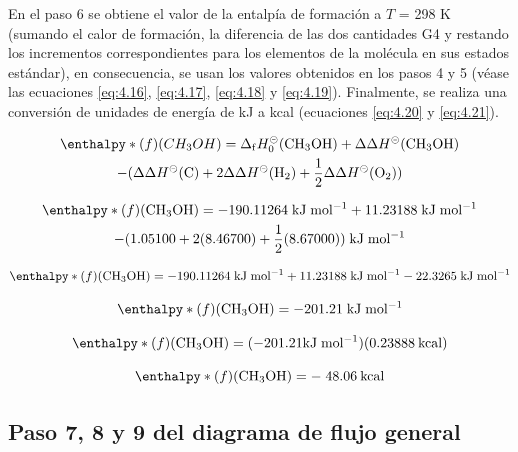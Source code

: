 En el paso 6 se obtiene el valor de la entalpía de formación a $T$ = 298 K (sumando el calor de formación, la diferencia de las dos cantidades G4 y restando los incrementos correspondientes para los elementos de la molécula en sus estados estándar), en consecuencia, se usan los valores obtenidos en los pasos 4 y 5 (véase las ecuaciones \ref{eq:4.16}, \ref{eq:4.17}, \ref{eq:4.18} y \ref{eq:4.19}). Finalmente, se realiza una conversión de unidades de energía de kJ a kcal (ecuaciones \ref{eq:4.20} y \ref{eq:4.21}).

\begin{multline}
	\enthalpy*(f){}(CH_3OH) = \Delta_\mathrm{{f}} H^{\circleddash}_{0}\mathrm{(CH_{3}OH)} + \Delta \Delta H^{\circleddash} \mathrm{(CH_{3}OH)} \\ - (\Delta \Delta H^{\circleddash} \mathrm{(C)} + 2 \Delta \Delta H^{\circleddash}\mathrm{(H_{2})} + \frac{1}{2} \Delta \Delta H^{\circleddash}\mathrm{(O_{2}))}
\label{eq:4.16}
\end{multline}

\begin{multline}
	\enthalpy*(f){}\mathrm{(CH_3OH)} = -190.11264\;\mathrm{kJ\;mol^{-1}} + 11.23188\;\mathrm{kJ\;mol^{-1}}  \\ - (1.05100 + 2(8.46700) + \frac{1}{2} (8.67000))\mathrm{\; kJ\;mol^{-1}}
\label{eq:4.17}
\end{multline}

\begin{equation}
	\enthalpy*(f){}\mathrm{(CH_3OH) = -190.11264\;\mathrm{kJ\;mol^{-1}} + 11.23188\;\mathrm{kJ\;mol^{-1}} - 22.3265\;kJ\;mol^{-1}}
\label{eq:4.18}
\end{equation}

\begin{equation}
	\enthalpy*(f){}\mathrm{(CH_3OH) = -201.21\;kJ\;mol^{-1}}
\label{eq:4.19}
\end{equation}

\begin{equation}
	\enthalpy*(f){}\mathrm{(CH_3OH) = (-201.21 kJ\;mol^{-1})(0.23888 \:kcal)}
\label{eq:4.20}
\end{equation}

\begin{equation}
	\enthalpy*(f){}\mathrm{(CH_3OH) = -\;48.06 \:kcal}
\label{eq:4.21}
\end{equation}


\subsection{Paso 7, 8 y 9 del diagrama de flujo general}

